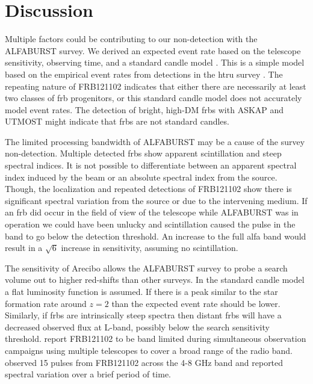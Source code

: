 \documentclass[a4paper,fleqn,usenatbib]{mnras}
\begin{document}
\section{Discussion}
\label{sec:discuss}

Multiple factors could be contributing to our non-detection with the ALFABURST
survey. We derived an expected event rate based on the telescope sensitivity,
observing time, and a standard candle model \citep{2013MNRAS.436L...5L}. This is
a simple model based on the empirical event rates from detections in the
\gls{htru} survey \citep{2013Sci...341...53T}.  The repeating nature of
FRB121102 indicates that either there are necessarily at least two classes of
\gls{frb} progenitors, or this standard candle model does not accurately model
event rates. The detection of bright, high-DM \glspl{frb} with ASKAP
\citep{2017ApJ...841L..12B} and UTMOST \citep{2017MNRAS.468.3746C,atel10697}
might indicate that \glspl{frb} are not standard candles.

The limited processing bandwidth of ALFABURST may be a cause of the survey
non-detection. Multiple detected \glspl{frb} show apparent scintillation and
steep spectral indices. It is not possible to differentiate between an apparent
spectral index induced by the beam or an absolute spectral index from the
source. Though, the localization and repeated detections of FRB121102 show there
is significant spectral variation from the source or due to the intervening
medium.  If an \gls{frb} did occur in the field of view of the telescope while
ALFABURST was in operation we could have been unlucky and scintillation caused
the pulse in the band to go below the detection threshold. An increase to the
full \gls{alfa} band would result in a $\sqrt{6}$ increase in sensitivity,
assuming no scintillation.

The sensitivity of Arecibo allows the ALFABURST survey to probe a search volume
out to higher red-shifts than other surveys. In the standard candle model a flat
luminosity function is assumed. If there is a peak similar to the star
formation rate around $z=2$ \citep{2014ARA&A..52..415M} than the expected event
rate should be lower. Similarly, if \glspl{frb} are intrinsically steep spectra
then distant \glspl{frb} will have a decreased observed flux at L-band, possibly
below the search sensitivity threshold. \cite{2017arXiv170507553L} report
FRB121102 to be band limited during simultaneous observation campaigns using
multiple telescopes to cover a broad range of the radio band. \cite{atel10675}
observed 15 pulses from FRB121102 across the 4-8 GHz band and reported spectral
variation over a brief period of time.
\end{document}
